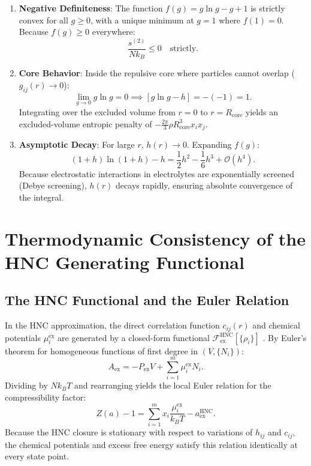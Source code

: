 \documentclass[11pt,a4paper]{article}
\begin{document}
\begin{enumerate}
    \item \textbf{Negative Definiteness}: The function $f(g) = g \ln g - g + 1$ is strictly convex for all $g \ge 0$, with a unique minimum at $g = 1$ where $f(1) = 0$. Because $f(g) \ge 0$ everywhere:
    \begin{equation}
    \frac{s^{(2)}}{N k_B} \le 0 \quad \text{strictly}.
    \end{equation}
    \item \textbf{Core Behavior}: Inside the repulsive core where particles cannot overlap ($g_{ij}(r) \to 0$):
    \begin{equation}
    \lim_{g \to 0} g \ln g = 0 \implies \left[ g \ln g - h \right] = -(-1) = 1.
    \end{equation}
    Integrating over the excluded volume from $r = 0$ to $r = R_{\text{core}}$ yields an excluded-volume entropic penalty of $-\frac{2\pi}{3}\rho R_{\text{core}}^3 x_i x_j$.
    \item \textbf{Asymptotic Decay}: For large $r$, $h(r) \to 0$. Expanding $f(g)$:
    \begin{equation}
    (1 + h)\ln(1 + h) - h = \frac{1}{2} h^2 - \frac{1}{6} h^3 + \mathcal{O}(h^4).
    \end{equation}
    Because electrostatic interactions in electrolytes are exponentially screened (Debye screening), $h(r)$ decays rapidly, ensuring absolute convergence of the integral.
\end{enumerate}


\section{Thermodynamic Consistency of the HNC Generating Functional}

\subsection{The HNC Functional and the Euler Relation}

In the HNC approximation, the direct correlation function $c_{ij}(r)$ and chemical potentials $\mu_i^{\text{ex}}$ are generated by a closed-form functional $\mathcal{F}_{\text{ex}}^{\text{HNC}}[\{\rho_i\}]$ \cite{Morita1961, Singer1985}. By Euler's theorem for homogeneous functions of first degree in $(V, \{N_i\})$:
\begin{equation}
A_{\text{ex}} = - P_{\text{ex}} V + \sum_{i=1}^{m} \mu_i^{\text{ex}} N_i.
\end{equation}
Dividing by $N k_B T$ and rearranging yields the local Euler relation for the compressibility factor:
\begin{equation}
\label{eq:za_euler}
Z(a) - 1 = \sum_{i=1}^{m} x_i \frac{\mu_i^{\text{ex}}}{k_B T} - a_{\text{ex}}^{\text{HNC}}.
\end{equation}
Because the HNC closure is stationary with respect to variations of $h_{ij}$ and $c_{ij}$, the chemical potentials and excess free energy satisfy this relation identically at every state point.
\end{document}
